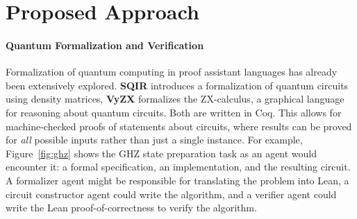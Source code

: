 \documentclass[letterpaper]{article} %
\begin{document}
\section{Proposed Approach}

\paragraph{Quantum Formalization and Verification}

Formalization of quantum computing in proof assistant languages has already been
extensively explored. \textbf{SQIR} \cite{hietala2021verified} introduces a formalization
of quantum circuits using density matrices, \textbf{VyZX} \cite{lehmann2026vy}
formalizes the ZX-calculus, a graphical language for reasoning about quantum circuits. Both are written in Coq.
This allows for machine-checked proofs of statements about circuits,
where results can be proved for \textit{all} possible inputs rather than just a single instance.
For example, Figure~\ref{fig:ghz} shows the GHZ state preparation task as an agent would encounter it:
a formal specification, an implementation, and the resulting circuit.
A formalizer agent might be responsible for translating the problem into Lean, a circuit constructor agent
could write the algorithm, and a verifier agent could write the Lean proof-of-correctness to verify the algorithm.
\end{document}
